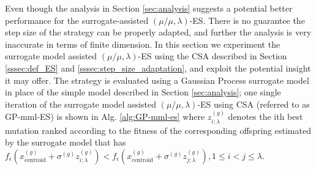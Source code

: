 		



Even though the analysis in Section \ref{sec:analysis} suggests a potential better performance for the surrogate-assisted $(\mu/\mu,\lambda)$-ES. There is no guarantee the step size of the strategy can be properly adapted, and further the analysis is very inaccurate in terms of finite dimension. In this section we experiment the surrogate model assisted $(\mu/\mu,\lambda)$-ES using the CSA described in Section \ref{sssec:def_ES} and \ref{sssec:step_size_adaptation}, and exploit the potential insight it may offer. The strategy is evaluated using a Gaussian Process surrogate model in place of the simple model described in Section \ref{sec:analysis}; one single iteration of the surrogate model assisted $(\mu/\mu,\lambda)$-ES using CSA (referred to as GP-mml-ES) is shown in Alg. \ref{alg:GP-mml-es} where $z_{i;\lambda}^{(g)}$ denotes the ith best mutation ranked according to the fitness of the corresponding offspring estimated by the surrogate model that has $f_{\epsilon}(x_{\text{centroid}}^{(g)} + \sigma^{(g)} z_{i;\lambda}^{(g)})<f_{\epsilon}(x_{\text{centroid}}^{(g)} + \sigma^{(g)} z_{j;\lambda}^{(g)}),1 \leq i < j \leq \lambda$. 

